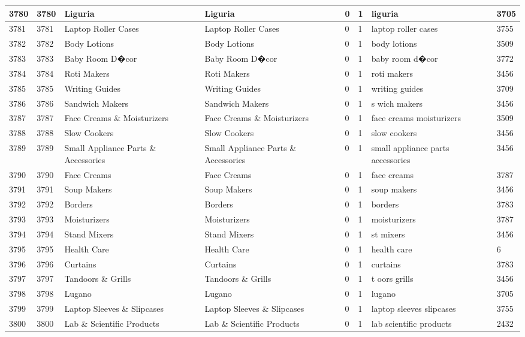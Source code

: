 \begin{longtable}{|l|l|l|l|l|l|l|l|}
3780 & 3780 & Liguria & Liguria & 0 & 1 & liguria & 3705 \\ \hline 
3781 & 3781 & Laptop Roller Cases & Laptop Roller Cases & 0 & 1 & laptop roller cases & 3755 \\ \hline 
3782 & 3782 & Body Lotions & Body Lotions & 0 & 1 & body lotions & 3509 \\ \hline 
3783 & 3783 & Baby Room D�cor & Baby Room D�cor & 0 & 1 & baby room d�cor & 3772 \\ \hline 
3784 & 3784 & Roti Makers & Roti Makers & 0 & 1 & roti makers & 3456 \\ \hline 
3785 & 3785 & Writing Guides & Writing Guides & 0 & 1 & writing guides & 3709 \\ \hline 
3786 & 3786 & Sandwich Makers & Sandwich Makers & 0 & 1 & s wich makers & 3456 \\ \hline 
3787 & 3787 & Face Creams \& Moisturizers & Face Creams \& Moisturizers & 0 & 1 & face creams moisturizers & 3509 \\ \hline 
3788 & 3788 & Slow Cookers & Slow Cookers & 0 & 1 & slow cookers & 3456 \\ \hline 
3789 & 3789 & Small Appliance Parts \& Accessories & Small Appliance Parts \& Accessories & 0 & 1 & small appliance parts accessories & 3456 \\ \hline 
3790 & 3790 & Face Creams & Face Creams & 0 & 1 & face creams & 3787 \\ \hline 
3791 & 3791 & Soup Makers & Soup Makers & 0 & 1 & soup makers & 3456 \\ \hline 
3792 & 3792 & Borders & Borders & 0 & 1 & borders & 3783 \\ \hline 
3793 & 3793 & Moisturizers & Moisturizers & 0 & 1 & moisturizers & 3787 \\ \hline 
3794 & 3794 & Stand Mixers & Stand Mixers & 0 & 1 & st mixers & 3456 \\ \hline 
3795 & 3795 & Health Care & Health Care & 0 & 1 & health care & 6 \\ \hline 
3796 & 3796 & Curtains & Curtains & 0 & 1 & curtains & 3783 \\ \hline 
3797 & 3797 & Tandoors \& Grills & Tandoors \& Grills & 0 & 1 & t oors grills & 3456 \\ \hline 
3798 & 3798 & Lugano & Lugano & 0 & 1 & lugano & 3705 \\ \hline 
3799 & 3799 & Laptop Sleeves \& Slipcases & Laptop Sleeves \& Slipcases & 0 & 1 & laptop sleeves slipcases & 3755 \\ \hline 
3800 & 3800 & Lab \& Scientific Products & Lab \& Scientific Products & 0 & 1 & lab scientific products & 2432 \\ \hline 

\end{longtable}
